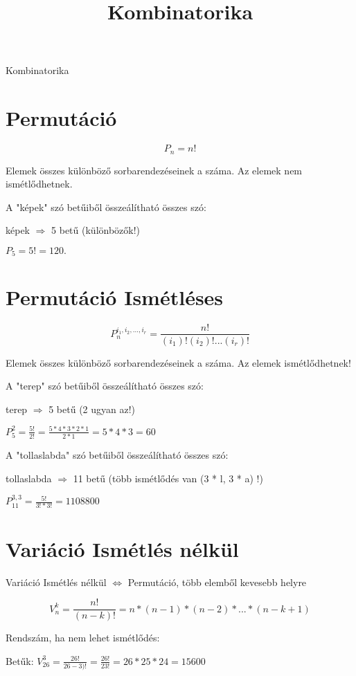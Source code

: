 \documentclass[a4paper,9pt,leqno]{article}
\begin{document}
\noindent
\setlength\parindent{0pt}
\title{Kombinatorika}

\begin{center}
{\huge Kombinatorika}
\end{center}

\section{Permutáció}

$$P_n = n!$$

Elemek összes különböző sorbarendezéseinek a száma. Az elemek nem ismétlődhetnek.

A "képek" szó betűiből összeálítható összes szó:

képek $\Rightarrow$ 5 betű (különbözők!)

$P_5 = 5! = 120.$

\section{Permutáció Ismétléses}

$$P_n^{i_1, i_2, ... , i_r} = \frac{n!}{(i_1)!(i_2)! ... (i_r)!}$$


Elemek összes különböző sorbarendezéseinek a száma. Az elemek ismétlődhetnek!


A "terep" szó betűiből összeálítható összes szó:


terep $\Rightarrow$ 5 betű (2 ugyan az!)


$P_5^{2} = \frac{5!}{2!} = \frac{5 * 4 * 3 * 2 * 1}{2 * 1} = 5 * 4 * 3 = 60$


A "tollaslabda" szó betűiből összeálítható összes szó:


tollaslabda $\Rightarrow$ 11 betű (több ismétlődés van (3 * l, 3 * a) !)


$P_{11}^{3, 3} = \frac{5!}{3! * 3!} = 1108800$


\section{Variáció Ismétlés nélkül}

Variáció Ismétlés nélkül $\iff$ Permutáció, több elemből kevesebb helyre

$$V_n^k = \frac{n!}{(n - k)!} = n * (n - 1) * (n - 2) * ... * (n - k + 1)$$

Rendszám, ha nem lehet ismétlődés:

Betűk:
$V_{26}^3 = \frac{26!}{26 - 3)!} = \frac{26!}{23!} = 26 * 25 * 24 = 15600$
\end{document}
